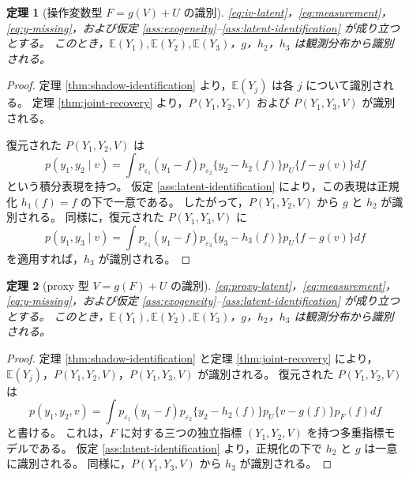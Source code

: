 \documentclass[dvipdfmx,autodetect-engine]{jsarticle}
\newtheorem{theorem}{定理}
\newcommand{\E}{\mathbb{E}}
\newcommand{\1}{\mathbf{1}}
\begin{document}
\begin{theorem}[操作変数型 $F=g(V)+U$ の識別]
\label{thm:iv-functions}
\eqref{eq:iv-latent}，\eqref{eq:measurement}，\eqref{eq:y-missing}，および仮定 \ref{ass:exogeneity}--\ref{ass:latent-identification} が成り立つとする。
このとき，$\E(Y_1),\E(Y_2),\E(Y_3)$，$g$，$h_2$，$h_3$ は観測分布から識別される。
\end{theorem}

\begin{proof}
定理 \ref{thm:shadow-identification} より，$\E(Y_j)$ は各 $j$ について識別される。
定理 \ref{thm:joint-recovery} より，$P(Y_1,Y_2,V)$ および $P(Y_1,Y_3,V)$ が識別される。

復元された $P(Y_1,Y_2,V)$ は
\begin{equation}
  p(y_1,y_2\mid v)
  = \int p_{\varepsilon_1}(y_1-f)
          p_{\varepsilon_2}\{y_2-h_2(f)\}
          p_U\{f-g(v)\}
    df
  \label{eq:iv-kernel-y12}
\end{equation}
という積分表現を持つ。
仮定 \ref{ass:latent-identification} により，この表現は正規化 $h_1(f)=f$ の下で一意である。
したがって，$P(Y_1,Y_2,V)$ から $g$ と $h_2$ が識別される。
同様に，復元された $P(Y_1,Y_3,V)$ に
\begin{equation}
  p(y_1,y_3\mid v)
  = \int p_{\varepsilon_1}(y_1-f)
          p_{\varepsilon_3}\{y_3-h_3(f)\}
          p_U\{f-g(v)\}
    df
  \label{eq:iv-kernel-y13}
\end{equation}
を適用すれば，$h_3$ が識別される。
\end{proof}

\begin{theorem}[proxy 型 $V=g(F)+U$ の識別]
\label{thm:proxy-functions}
\eqref{eq:proxy-latent}，\eqref{eq:measurement}，\eqref{eq:y-missing}，および仮定 \ref{ass:exogeneity}--\ref{ass:latent-identification} が成り立つとする。
このとき，$\E(Y_1),\E(Y_2),\E(Y_3)$，$g$，$h_2$，$h_3$ は観測分布から識別される。
\end{theorem}

\begin{proof}
定理 \ref{thm:shadow-identification} と定理 \ref{thm:joint-recovery} により，$\E(Y_j)$，$P(Y_1,Y_2,V)$，$P(Y_1,Y_3,V)$ が識別される。
復元された $P(Y_1,Y_2,V)$ は
\begin{equation}
  p(y_1,y_2,v)
  = \int p_{\varepsilon_1}(y_1-f)
          p_{\varepsilon_2}\{y_2-h_2(f)\}
          p_U\{v-g(f)\}
          p_F(f)
    df
  \label{eq:proxy-kernel-y12}
\end{equation}
と書ける。
これは，$F$ に対する三つの独立指標 $(Y_1,Y_2,V)$ を持つ多重指標モデルである。
仮定 \ref{ass:latent-identification} より，正規化の下で $h_2$ と $g$ は一意に識別される。
同様に，$P(Y_1,Y_3,V)$ から $h_3$ が識別される。
\end{proof}
\end{document}
